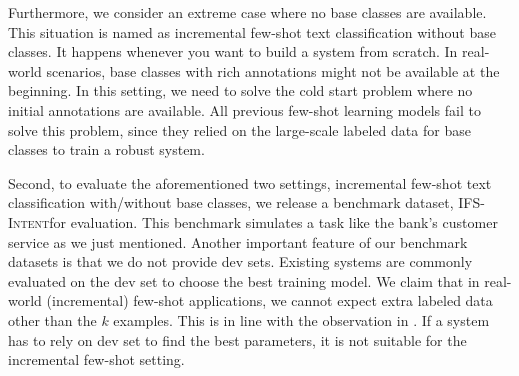 \documentclass[11pt]{article}
\newcommand{\intentdata}{\textsc{IFS-Intent}}
\begin{document}
Furthermore, we consider an extreme case where no base classes are available. This situation is named as incremental few-shot text classification without base classes. It happens whenever you want to build a system from scratch. In real-world scenarios, base classes with rich annotations might not be available at the beginning. In this setting, we need to solve the cold start problem where no initial annotations are available. All previous few-shot learning models \cite{DBLPSnellSZ17, DBLPGidarisK18, DBLPRenLFZ19} fail to solve this problem, since they relied on the large-scale labeled data for base classes to train a robust system. 

Second, to evaluate the aforementioned two settings, incremental few-shot text classification with/without base classes, we release a benchmark dataset, \intentdata\enspace for evaluation. This benchmark simulates a task like the bank's customer service as we just mentioned. Another important feature of our benchmark datasets is that we do not provide dev sets. Existing systems are commonly evaluated on the dev set to choose the best training model. We claim that in real-world (incremental) few-shot applications, we cannot expect extra labeled data other than the $k$ examples. This is in line with the observation in \citet{DBLP07676}. If a system has to rely on dev set to find the best parameters, it is not suitable for the incremental few-shot setting.

\end{document}

